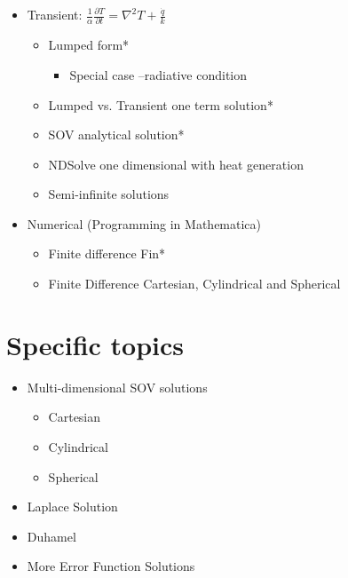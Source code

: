 \begin{appendices}
\begin{itemize}
\item Transient: $\frac{1}{\alpha}\frac{\partial T}{\partial t}
=\nabla^2T+\frac{\dot{q}}{k}$
\begin{itemize}
\item Lumped form*
\begin{itemize}
\item Special case –radiative condition
\end{itemize}
\item Lumped vs. Transient one term solution*
\item SOV analytical solution*
\item NDSolve one dimensional with heat generation
\item Semi-infinite solutions
\end{itemize}


\item Numerical (Programming in Mathematica)
\begin{itemize}
\item Finite difference Fin*
\item Finite Difference Cartesian, Cylindrical and Spherical
\end{itemize}

\end{itemize}

\section*{Specific topics \uppercase\expandafter{}}
\begin{itemize}
\item Multi-dimensional SOV solutions
\begin{itemize}
\item Cartesian
\item Cylindrical
\item Spherical
\end{itemize}

\item Laplace Solution
\item Duhamel
\item More Error Function Solutions
\end{itemize}


\end{appendices}
